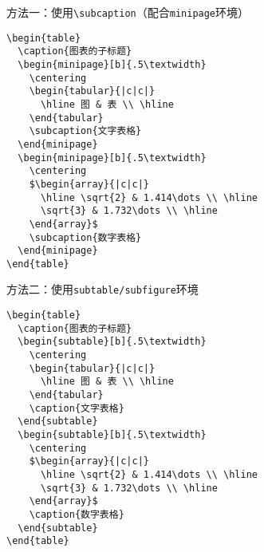 \begin{frame}[fragile]
方法一：使用\verb|\subcaption|（配合\texttt{minipage}环境）
\small
\begin{lstlisting}
\begin{table}
  \caption{图表的子标题}
  \begin{minipage}[b]{.5\textwidth}
    \centering
    \begin{tabular}{|c|c|}
      \hline 图 & 表 \\ \hline
    \end{tabular}
    \subcaption{文字表格}
  \end{minipage}
  \begin{minipage}[b]{.5\textwidth}
    \centering
    $\begin{array}{|c|c|}
      \hline \sqrt{2} & 1.414\dots \\ \hline
      \sqrt{3} & 1.732\dots \\ \hline
    \end{array}$
    \subcaption{数字表格}
  \end{minipage}
\end{table}
\end{lstlisting}
\end{frame}
\begin{frame}[fragile]
方法二：使用\texttt{subtable/subfigure}环境
\small
\begin{lstlisting}
\begin{table}
  \caption{图表的子标题}
  \begin{subtable}[b]{.5\textwidth}
    \centering
    \begin{tabular}{|c|c|}
      \hline 图 & 表 \\ \hline
    \end{tabular}
    \caption{文字表格}
  \end{subtable}
  \begin{subtable}[b]{.5\textwidth}
    \centering
    $\begin{array}{|c|c|}
      \hline \sqrt{2} & 1.414\dots \\ \hline
      \sqrt{3} & 1.732\dots \\ \hline
    \end{array}$
    \caption{数字表格}
  \end{subtable}
\end{table}
\end{lstlisting}
\end{frame}